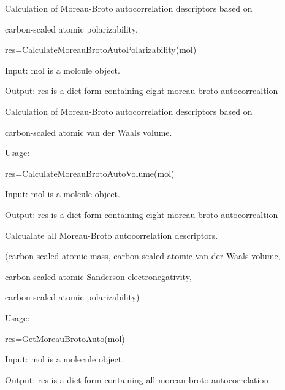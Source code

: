 \documentclass[letterpaper,10pt,english]{sphinxmanual}
\begin{document}

\begin{fulllineitems}
\label{reference/moreaubroto:moreaubroto.CalculateMoreauBrotoAutoPolarizability}
Calculation of Moreau-Broto autocorrelation descriptors based on

carbon-scaled atomic polarizability.

res=CalculateMoreauBrotoAutoPolarizability(mol)

Input: mol is a molcule object.

Output: res is a dict form containing eight moreau broto autocorrealtion

\end{fulllineitems}


\begin{fulllineitems}
\label{reference/moreaubroto:moreaubroto.CalculateMoreauBrotoAutoVolume}
Calculation of Moreau-Broto autocorrelation descriptors based on

carbon-scaled atomic van der Waals volume.

Usage:

res=CalculateMoreauBrotoAutoVolume(mol)

Input: mol is a molcule object.

Output: res is a dict form containing eight moreau broto autocorrealtion

\end{fulllineitems}


\begin{fulllineitems}
\label{reference/moreaubroto:moreaubroto.GetMoreauBrotoAuto}
Calcualate all Moreau-Broto autocorrelation descriptors.

(carbon-scaled atomic mass, carbon-scaled atomic van der Waals volume,

carbon-scaled atomic Sanderson electronegativity,

carbon-scaled atomic polarizability)

Usage:

res=GetMoreauBrotoAuto(mol)

Input: mol is a molecule object.

Output: res is a dict form containing all moreau broto autocorrelation

\end{fulllineitems}
\end{document}
